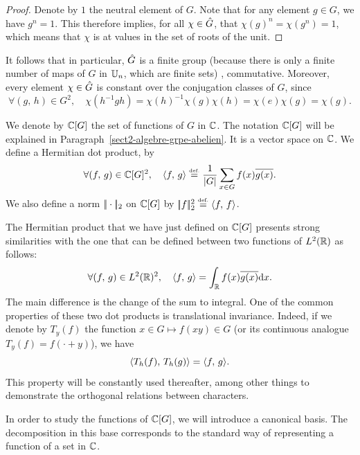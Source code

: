 \begin{proof}
 Denote by $ 1$ the neutral element of $G$. Note that for any element $ g \in G$, we have $ g^n = 1$. This therefore implies, for all $\chi \in \hat{G}$, that $\chi(g)^n = \chi(g^n) = 1$, which means that $\chi$ is at values in the set of  roots of the unit.
\end{proof}


\begin{rem}
It follows that in particular, $\hat{G}$ is a finite group (because there is only a finite number of maps of $G$ in $\mathbb{U}_n$, which are finite sets) , commutative. Moreover, every element $\chi \in \hat{G}$ is constant over the conjugation classes of $G$, since
\begin{equation}
\label{eq-character-constant-class-conjug}
\forall (g, \, h) \in G^2, \quad \chi(h^{-1} gh) = \chi(h)^{-1} \chi(g) \chi(h) = \chi(e) \chi(g) = \chi(g).
\end{equation}
\end{rem}


\begin{defn}
\label{defn-space-function-g-in-c}
 \label{notation-6} \label{notation-7} We denote by $\mathbb{C}[G]$ the set of functions of $G$ in $\mathbb{C}$. The notation $\mathbb{C}[G]$ will be explained in Paragraph~\ref{sect2-algebre-grpe-abelien}. It is a vector space on $\mathbb{C}$. We define a Hermitian dot product, by \label{notation-8} \label{notation-9} \label{notation-10}
\begin{equation}
\label{eq-defn-prod-herm-c-g-abelien}
\forall (f, \, g) \in \mathbb{C}[G]^2, \quad \langle f,\,g\rangle \stackrel{\mbox{\upshape\tiny def.}}{=} \frac{1}{|G|} \sum_{x \in G}{f (x) \overline{g (x)}}.
\end{equation}
We also define a norm $|\!| \cdot |\!|_2 $ on $\mathbb{C}[G]$ by $|\!| f |\!|_2^2 \stackrel{\mbox{\upshape\tiny def.}}{=} \langle f,\,f\rangle$.
\end{defn}


\begin{rem}
\label{notation-11}  The Hermitian product that we have just defined on $\mathbb{C}[G]$ presents strong similarities with the one that can be defined between two functions of $L^2(\mathbb{R})$ as follows:
\begin{equation*}
\forall (f, \, g) \in L^2(\mathbb{R})^2, \quad \langle f,\,g\rangle = \int_{\mathbb{R}}{f (x) \overline{g (x)} \mathrm{d} x}.
\end{equation*}
The main difference is the change of the sum to integral. One of the common properties of these two dot products is translational invariance. Indeed, if we denote by $ T_y (f)$ the function $ x \in G \mapsto f (xy) \in G$ (or its continuous analogue $ T_y (f) = f(\cdot + y)$), we have
\begin{equation*}
\langle T_h (f),\,T_h(g)\rangle = \langle f,\,g\rangle.
\end{equation*}
This property will be constantly used thereafter, among other things to demonstrate the orthogonal relations between characters.
\end{rem}
In order to study the functions of $\mathbb{C}[G]$, we will introduce a canonical basis. The decomposition in this base corresponds to the standard way of representing a function of a set in $\mathbb{C}$.

